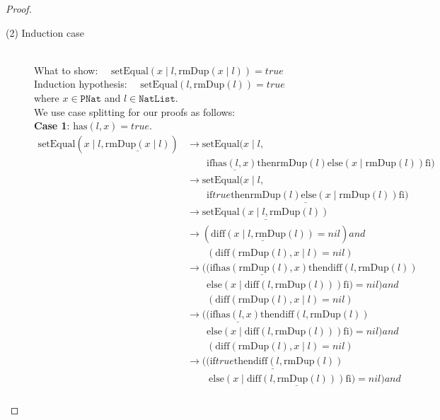 \documentclass[12pt, a4paper]{article}
\newcommand{\rel}[1]{\mathrel{#1}}
\newcommand{\rmx}[1]{\mathrm{#1}}
\newcommand{\larrow}{\longrightarrow}
\newcommand{\under}{\underline}
\begin{document}
\begin{proof}
\begin{description}
\item[(2) Induction case]~\\
What to show: $\quad \rmx{setEqual}(x \mid l, \rmx{rmDup}(x \mid l)) = true$\\
Induction hypothesis: $\quad \rmx{setEqual}(l, \rmx{rmDup}(l)) = true$  \\
where $x \in \mathtt{PNat}$ and $l \in \mathtt{NatList}$.\\
We use case splitting for our proofs as follows: \\
\textbf{Case 1}: $\rmx{has}(l, x) = true$.
\begin{align*}
\rmx{setEqual}(x \mid l, \under{\rmx{rmDup}(x \mid l)})
	&\larrow \rmx{setEqual}(x \mid l, \\
	&\quad \quad \rel{\rmx{if}} \under{\rmx{has}(l, x)} \rel{\rmx{then}} \rmx{rmDup}(l) \rel{\rmx{else}} (x \mid \rmx{rmDup}(l)) \rel{\rmx{fi}}) \tag{by rmDup2} \\
	&\larrow \rmx{setEqual}(x \mid l, \\
	&\quad \quad \under{\rel{\rmx{if}} true \rel{\rmx{then}} \rmx{rmDup}(l) \rel{\rmx{else}} (x \mid \rmx{rmDup}(l)) \rel{\rmx{fi}}}) \tag{by case splitting} \\
	&\larrow \under{\rmx{setEqual}(x \mid l, \rmx{rmDup}(l))} \tag{by if1} \\
	&\larrow (\under{\rmx{diff}(x \mid l, \rmx{rmDup}(l))} = nil) \rel{and} \\
	&\quad \quad (\rmx{diff}(\rmx{rmDup}(l), x \mid l) = nil) \tag{by setEq} \\
	&\larrow ((\rel{\rmx{if}} \under{\rmx{has}(\rmx{rmDup}(l), x)} \rel{\rmx{then}} \rmx{diff}(l, \rmx{rmDup}(l)) \\
	&\quad \quad \rel{\rmx{else}} (x \mid \rmx{diff}(l, \rmx{rmDup}(l))) \rel{\rmx{fi}}) = nil) \rel{and} \\
	&\quad \quad (\rmx{diff}(\rmx{rmDup}(l), x \mid l) = nil) \tag{by diff2} \\
	&\larrow ((\rel{\rmx{if}} \under{\rmx{has}(l, x)} \rel{\rmx{then}} \rmx{diff}(l, \rmx{rmDup}(l)) \\
	&\quad \quad \rel{\rmx{else}} (x \mid \rmx{diff}(l, \rmx{rmDup}(l))) \rel{\rmx{fi}}) = nil) \rel{and} \\
	&\quad \quad (\rmx{diff}(\rmx{rmDup}(l), x \mid l) = nil) \tag{by Problem 17 - Lemma 1} \\
	&\larrow \under{((\rel{\rmx{if}} true \rel{\rmx{then}} \rmx{diff}(l, \rmx{rmDup}(l))} \\
	&\quad \quad\ \under{\rel{\rmx{else}} (x \mid \rmx{diff}(l, \rmx{rmDup}(l))) \rel{\rmx{fi}}) = nil)} \rel{and} \\

\end{align*}
\end{description}
\end{proof}
\end{document}
